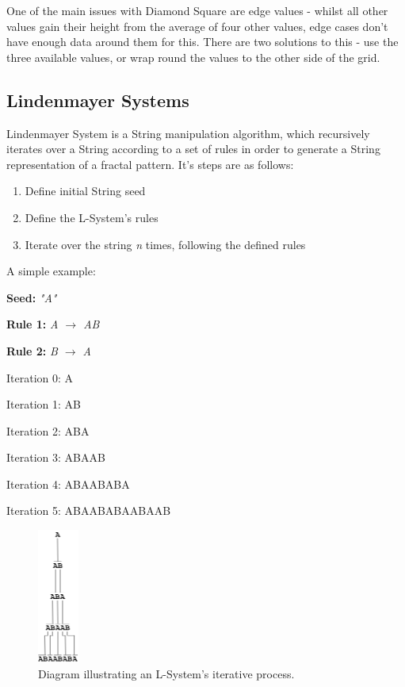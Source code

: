 \documentclass[a4paper,10pt]{report}
\begin{document}
One of the main issues with Diamond Square are edge values - whilst all other values gain their height from the average of four other values, edge cases don't have enough data around them for this. There are two solutions to this - use the three available values, or wrap round the values to the other side of the grid. 

\subsection{Lindenmayer Systems}

Lindenmayer System is a String manipulation algorithm, which recursively iterates over a String according to a set of rules in order to generate a String representation of a fractal pattern. It's steps are as follows:

\begin{enumerate}
    \item Define initial String seed
    \item Define the L-System's rules
    \item Iterate over the string \textit{n} times, following the defined rules
\end{enumerate}



A simple example:\medskip

\textbf{Seed:} \textit{"A"}

\textbf{Rule 1:} \textit{A $\rightarrow$ AB}

\textbf{Rule 2:} \textit{B $\rightarrow$ A}


Iteration 0: A

Iteration 1: AB

Iteration 2: ABA

Iteration 3: ABAAB

Iteration 4: ABAABABA

Iteration 5: ABAABABAABAAB\medskip


\begin{figure}[h!]
\centering
  \includegraphics[width=0.12\textwidth]{Images/Charts/AB_Example.png}
 \caption{Diagram illustrating an L-System's iterative process.}
 \label{fig:l_system_AB}
\end{figure}
\end{document}
